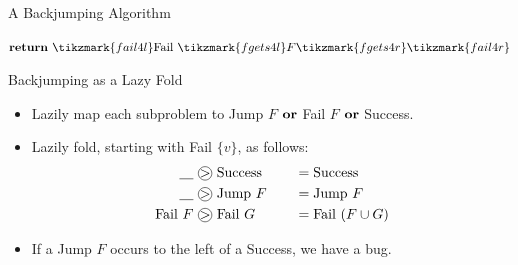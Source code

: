 \documentclass{beamer}
\newcommand*\circled[1]{\tikz[baseline=(char.base)]{
            \node[shape=circle,draw,inner sep=0pt] (char) {#1};}}
\begin{document}
\begin{frame}{A Backjumping Algorithm}
\begin{algorithm}[H]
{{{{                    \nl {}
                }
            }
        }
        \nl $\KwSty{return}~\tikzmark{fail4l}\textnormal{Fail}~\tikzmark{fgets4l}F\tikzmark{fgets4r}\tikzmark{fail4r}$ \;
    }
    \end{algorithm}
\end{frame}

\begin{frame}{Backjumping as a Lazy Fold}
    \begin{itemize}
        \item Lazily map each subproblem to Jump $F$ $\KwSty{or}$ Fail $F$ $\KwSty{or}$ Success.
        \item Lazily fold, starting with Fail $\{ v \}$, as follows:
            \begin{alignat*}{2}
                \underline{\hspace{1em}} &~\circled{$>$}~ \textnormal{Success} \hspace{1em} &&= \textnormal{Success} \\
                \underline{\hspace{1em}} &~\circled{$>$}~ \textnormal{Jump}~F \hspace{1em} &&= \textnormal{Jump}~F \\
                \textnormal{Fail}~F &~\circled{$>$}~ \textnormal{Fail}~G \hspace{1em} &&= \textnormal{Fail}~(F \cup G)
            \end{alignat*}
        \item If a Jump $F$ occurs to the left of a Success, we have a bug.
    \end{itemize}
\end{frame}
\end{document}
